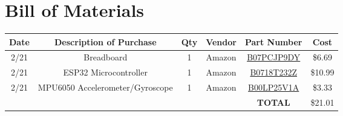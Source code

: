 \chapter{Bill of Materials}
\label{chap:bom}

\begin{tabular}{|c|c|c|c|c|c|}\hline
  Date & Description of Purchase & Qty & Vendor & Part Number & Cost\\\hline\hline
  2/21 & Breadboard & 1 & Amazon & \href{https://www.amazon.com/Pcs-MCIGICM-Points-Solderless-Breadboard/dp/B07PCJP9DY/}{B07PCJP9DY}
                                                              & \$6.69\\\hline
  2/21 & ESP32 Microcontroller & 1 & Amazon & \href{https://www.amazon.com/HiLetgo-ESP-WROOM-32-Development-Microcontroller-Integrated/dp/B0718T232Z/}{B0718T232Z}
                                                              & \$10.99\\\hline
  2/21 & MPU6050 Accelerometer/Gyroscope & 1 & Amazon & \href{https://www.amazon.com/HiLetgo-MPU-6050-Accelerometer-Gyroscope-Converter/dp/B00LP25V1A/}{B00LP25V1A}
                                                              & \$3.33\\\hline\hline
  & & & & \textbf{TOTAL} & \$21.01\\\hline
\end{tabular}


